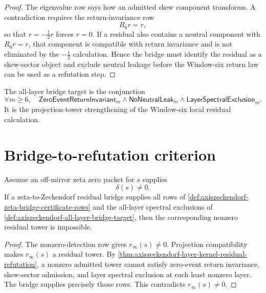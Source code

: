 \begin{proof}
The eigenvalue row says how an admitted skew component transforms.  A
contradiction requires the return-invariance row
$$
R_6r=r,
$$
so that $r=-\frac{1}{2}r$ forces $r=0$.  If a residual also contains a
neutral component with $R_6r=r$, that component is compatible with return
invariance and is not eliminated by the $-\frac{1}{2}$ calculation.  Hence
the bridge must identify the residual as a skew-sector object and exclude
neutral leakage before the Window-six return law can be used as a refutation
step.
\end{proof}

\begin{definition}
\label{def:axiszeckendorf-all-layer-bridge-target}
The all-layer bridge target is the conjunction
$$
\forall m\geq6,\quad
\mathsf{ZeroEventReturnInvariant}_{m}
\wedge
\mathsf{NoNeutralLeak}_{m}
\wedge
\mathsf{LayerSpectralExclusion}_{m}.
$$
It is the projection-tower strengthening of the Window-six local residual
calculation.
\end{definition}

\section{Bridge-to-refutation criterion}
\label{sec:axiszeckendorf-bridge-to-refutation-criterion}

\begin{theorem}
\label{thm:axiszeckendorf-bridge-rows-close-residual-refutation}
Assume an off-mirror zeta zero packet for $s$ supplies
$$
\delta(s)\neq0.
$$
If a zeta-to-Zeckendorf residual bridge supplies all rows of
\autoref{def:axiszeckendorf-zeta-bridge-certificate-rows} and the all-layer
spectral exclusions of
\autoref{def:axiszeckendorf-all-layer-bridge-target}, then the corresponding
nonzero residual tower is impossible.
\end{theorem}

\begin{proof}
The nonzero-detection row gives $r_\infty(s)\neq0$.  Projection
compatibility makes $r_\infty(s)$ a residual tower.  By
\autoref{thm:axiszeckendorf-layer-kernel-residual-refutation}, a nonzero
admitted tower cannot satisfy zero-event return invariance, skew-sector
admission, and layer spectral exclusion at each least nonzero layer.  The
bridge supplies precisely those rows.  This contradicts
$r_\infty(s)\neq0$.
\end{proof}

